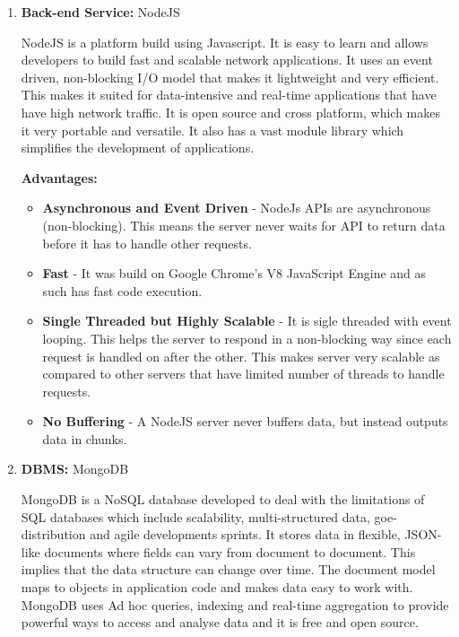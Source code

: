 \documentclass[12pt]{article}
\begin{document}
		\begin{enumerate}
			\item \textbf{Back-end Service:} NodeJS
			\begin{flushleft}
				NodeJS is a platform build using Javascript. It is easy to learn and allows developers to build fast and scalable network applications. It uses an event driven, non-blocking I/O model that makes it lightweight and very efficient. This makes it suited for data-intensive and real-time applications that have have high network traffic. It is open source and cross platform, which makes it very portable and versatile. It also has a vast module library which simplifies the development of applications.

			\end{flushleft}
			\textbf{Advantages:}
			\begin{itemize}
				\item \textbf{Asynchronous and Event Driven} - NodeJs APIs are asynchronous (non-blocking). This means the server never waits for API to return data before it has to handle other requests.
				\item \textbf{Fast} - It was build on Google Chrome's V8 JavaScript Engine and as such has fast code execution.
				\item \textbf{Single Threaded but Highly Scalable} - It is sigle threaded with event looping. This helps the server to respond in a non-blocking way since each request is handled on after the other. This makes server very scalable as compared to other servers that have limited number of threads to handle requests.
				\item \textbf{No Buffering} - A NodeJS server never buffers data, but instead outputs data in chunks.
			\end{itemize}

			\item \textbf{DBMS:} MongoDB
			\begin{flushleft}
				MongoDB is a NoSQL database developed to deal with the limitations of SQL databases which include scalability, multi-structured data, goe-distribution and agile developments sprints. It stores data in flexible, JSON-like documents where fields can vary from document to document. This implies that the data structure can change over time. The document model maps to objects in application code and makes data easy to work with. MongoDB uses Ad hoc queries, indexing and real-time aggregation to provide powerful ways to access and analyse data and it is free and open source.
			\end{flushleft}
		\end{enumerate}
\end{document}
